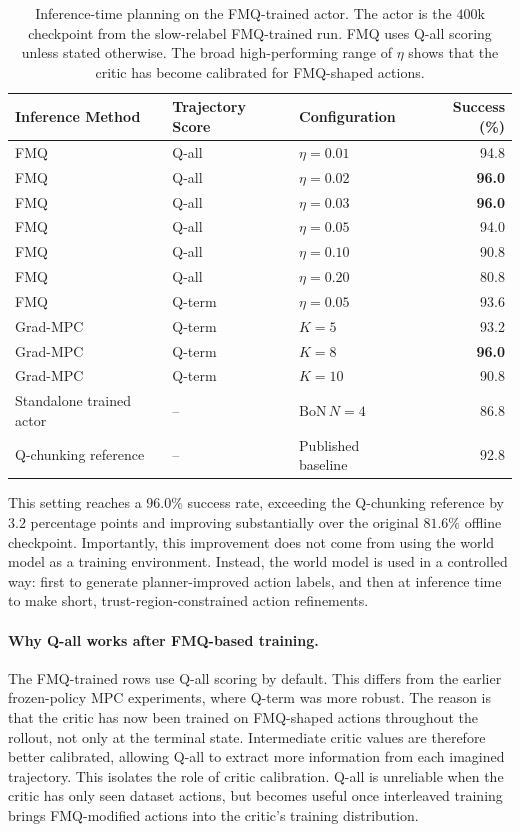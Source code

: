 \begin{table}[h]
\centering
\caption{Inference-time planning on the FMQ-trained actor. The actor
is the $400$k checkpoint from the slow-relabel FMQ-trained run.
FMQ uses Q-all scoring unless stated otherwise. The broad high-performing
range of $\eta$ shows that the critic has become calibrated for
FMQ-shaped actions.}
\label{tab:mpc-fmq-distilled}
\begin{tabular}{lllr}
\toprule
Inference Method & Trajectory Score & Configuration & Success (\%) \\
\midrule
FMQ & Q-all  & $\eta = 0.01$ & 94.8 \\
FMQ & Q-all  & $\eta = 0.02$ & \textbf{96.0} \\
FMQ & Q-all  & $\eta = 0.03$ & \textbf{96.0} \\
FMQ & Q-all  & $\eta = 0.05$ & 94.0 \\
FMQ & Q-all  & $\eta = 0.10$ & 90.8 \\
FMQ & Q-all  & $\eta = 0.20$ & 80.8 \\
FMQ & Q-term & $\eta = 0.05$ & 93.6 \\
\midrule
Grad-MPC & Q-term & $K = 5$  & 93.2 \\
Grad-MPC & Q-term & $K = 8$  & \textbf{96.0} \\
Grad-MPC & Q-term & $K = 10$ & 90.8 \\
\midrule
Standalone trained actor & -- & $\mathrm{BoN}\,N=4$ & 86.8 \\
Q-chunking reference & -- & Published baseline & 92.8 \\
\bottomrule
\end{tabular}
\end{table}

This setting reaches a $96.0\%$ success rate, exceeding the Q-chunking
reference by $3.2$ percentage points and improving substantially over
the original $81.6\%$ offline checkpoint. Importantly, this improvement
does not come from using the world model as a training environment.
Instead, the world model is used in a controlled way: first to generate
planner-improved action labels, and then at inference time to make
short, trust-region-constrained action refinements.

\paragraph{Why Q-all works after FMQ-based training.}
The FMQ-trained rows use Q-all scoring by default. This differs from
the earlier frozen-policy MPC experiments, where Q-term was more robust.
The reason is that the critic has now been trained on FMQ-shaped actions
throughout the rollout, not only at the terminal state. Intermediate
critic values are therefore better calibrated, allowing Q-all to extract
more information from each imagined trajectory.
This isolates the role of critic calibration. Q-all is unreliable when
the critic has only seen dataset actions, but becomes useful once
interleaved training brings FMQ-modified actions into the critic's
training distribution.

